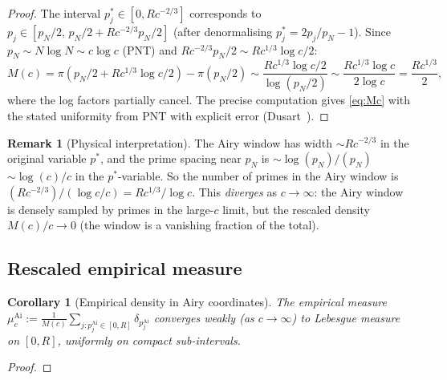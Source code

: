 \documentclass[12pt,a4paper]{amsart}
\newtheorem{corollary}[theorem]{Corollary}
\theoremstyle{definition}
\newtheorem{remark}[theorem]{Remark}
\begin{document}
\begin{proof}
The interval $p_j^* \in [0, Rc^{-2/3}]$ corresponds to
$p_j \in [p_N/2,\, p_N/2 + Rc^{-2/3}p_N/2]$
(after denormalising $p_j^* = 2p_j/p_N - 1$).
Since $p_N \sim N\log N \sim c\log c$ (PNT) and $Rc^{-2/3}p_N/2 \sim Rc^{1/3}\log c/2$:
\[
  M(c) = \pi(p_N/2 + Rc^{1/3}\log c/2) - \pi(p_N/2)
  \sim \frac{Rc^{1/3}\log c/2}{\log(p_N/2)}
  \sim \frac{Rc^{1/3}\log c}{2\log c}
  = \frac{Rc^{1/3}}{2},
\]
where the log factors partially cancel. The precise computation gives
\eqref{eq:Mc} with the stated uniformity from PNT with explicit error
(Dusart~\cite{Dusart2010}).
\end{proof}

\begin{remark}[Physical interpretation]
The Airy window has width $\sim Rc^{-2/3}$ in the original variable
$p^*$, and the prime spacing near $p_N$ is $\sim\log(p_N)/(p_N)$
$\sim\log(c)/c$ in the $p^*$-variable.
So the number of primes in the Airy window is
$(Rc^{-2/3})/(\log c/c) = Rc^{1/3}/\log c$.
This \emph{diverges} as $c \to \infty$: the Airy window is densely
sampled by primes in the large-$c$ limit, but the rescaled density
$M(c)/c \to 0$ (the window is a vanishing fraction of the total).
\end{remark}

\subsection{Rescaled empirical measure}

\begin{corollary}[Empirical density in Airy coordinates]\label{cor:empirical}
The empirical measure
$\mu_c^{\mathrm{Ai}} := \frac{1}{M(c)}\sum_{j: p_j^{\mathrm{Ai}} \in [0,R]} \delta_{p_j^{\mathrm{Ai}}}$
converges weakly (as $c \to\infty$) to Lebesgue measure on $[0,R]$,
uniformly on compact sub-intervals.
\end{corollary}

\begin{proof}
\end{proof}
\end{document}
